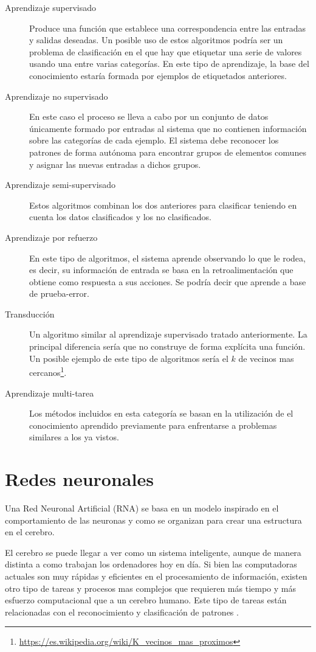 \begin{description}
    \item[Aprendizaje supervisado] Produce una función que establece una correspondencia entre las entradas y salidas deseadas. Un posible uso de estos algoritmos podría ser un problema de clasificación en el que hay que etiquetar una serie de valores usando una entre varias categorías. En este tipo de aprendizaje, la base del conocimiento estaría formada por ejemplos de etiquetados anteriores.
    \item[Aprendizaje no supervisado] En este caso el proceso se lleva a cabo por un conjunto de datos únicamente formado por entradas al sistema que no contienen información sobre las categorías de cada ejemplo. El sistema debe reconocer los patrones de forma autónoma para encontrar grupos de elementos comunes y asignar las nuevas entradas a dichos grupos.
    \item[Aprendizaje semi-supervisado] Estos algoritmos combinan los dos anteriores para clasificar teniendo en cuenta los datos clasificados y los no clasificados.
    \item[Aprendizaje por refuerzo] En este tipo de algoritmos, el sistema aprende observando lo que le rodea, es decir, su información de entrada se basa en la retroalimentación que obtiene como respuesta a sus acciones. Se podría decir que aprende a base de prueba-error.
    \item[Transducción] Un algoritmo similar al aprendizaje supervisado tratado anteriormente. La principal diferencia sería que no construye de forma explícita una función. Un posible ejemplo de este tipo de algoritmos sería el $k$ de vecinos mas cercanos\footnote{\url{https://es.wikipedia.org/wiki/K\_vecinos\_mas\_proximos}}.
    \item[Aprendizaje multi-tarea] Los métodos incluidos en esta categoría se basan en la utilización de el conocimiento aprendido previamente para enfrentarse a problemas similares a los ya vistos.
\end{description}

\section{Redes neuronales}
Una Red Neuronal Artificial (RNA) se basa en un modelo inspirado en el comportamiento de las neuronas y como se organizan para crear una estructura en el cerebro.

El cerebro se puede llegar a ver como un sistema inteligente, aunque de manera distinta a como trabajan los ordenadores hoy en día. Si bien las computadoras actuales son muy rápidas y eficientes en el procesamiento de información, existen otro tipo de tareas y procesos mas complejos que requieren más tiempo y más esfuerzo computacional que a un cerebro humano. Este tipo de tareas están relacionadas con el reconocimiento y clasificación de patrones \cite{redes_neuronales}.

